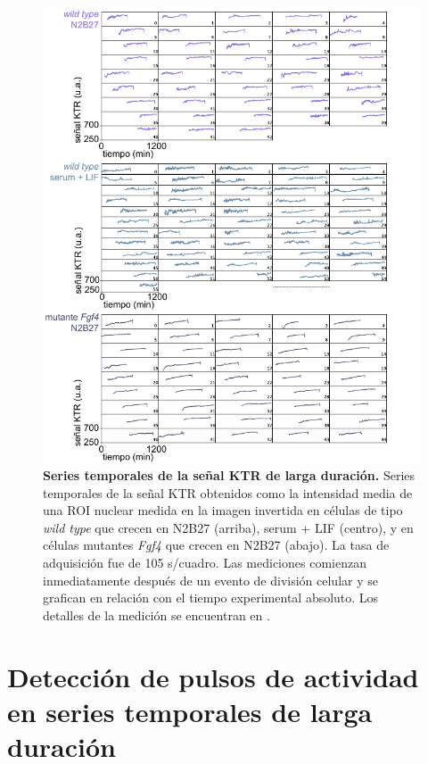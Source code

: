 \documentclass[./main.tex]{subfiles}
\begin{document}
\begin{figure}
    \centering
    \includegraphics[width=1\columnwidth]{figures/chapter4/C4_traces.pdf}
    \caption{\textbf{Series temporales de la señal KTR de larga duración.} Series temporales de la señal KTR obtenidos como la intensidad media de una ROI nuclear medida en la imagen invertida en células de tipo \textit{wild type} que crecen en N2B27 (arriba), serum + LIF (centro), y en células mutantes \textit{Fgf4} que crecen en N2B27 (abajo). La tasa de adquisición fue de 105 s/cuadro. Las mediciones comienzan inmediatamente después de un evento de división celular y se grafican en relación con el tiempo experimental absoluto. Los detalles de la medición se encuentran en \cite{Fabris2022}.}
    \label{C4_fig:traces}
\end{figure}

\section{Detección de pulsos de actividad en series temporales de larga duración}
\label{C4_sec:pulse_detection}
\end{document}
